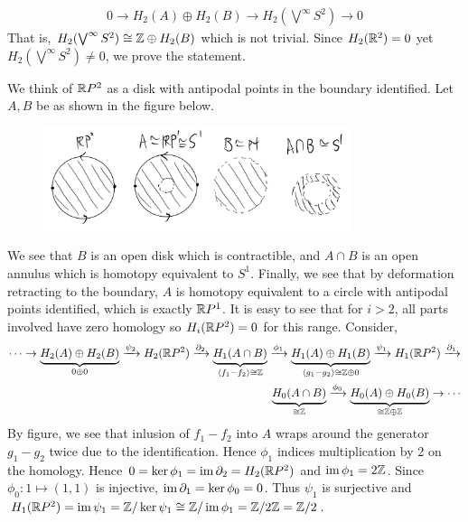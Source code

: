 \documentclass[12pt]{article}
\begin{document}
\begin{problem}[9]
\begin{align*}
	0 \to H_2(A) \oplus H_2(B) \to H_2(\bigvee^ \infty S^2) \to 0  
\end{align*}
That is, $H_2(\bigvee^ \infty S^2 ) \cong \mathbb{Z} \oplus H_2(B)$ which is not trivial. Since $ H_2(\mathbb{R}^2) = 0$ yet $ H_2(\bigvee^{ \infty}S^2) \neq 0$, we prove the statement.
\end{problem}

\begin{problem}[10]
We think of $ \mathbb{R} P^2$ as a disk with antipodal points in the boundary identified. Let $ A,B$ be as shown in the figure below.
~\begin{figure}[H]
	\centering
	\includegraphics[width=0.8\textwidth]{./figures/MV_RP2.png}
	\caption{}
\end{figure}
We see that $ B$ is an open disk which is contractible, and $ A \cap B$ is an open annulus which is homotopy equivalent to $ S^{1}$. Finally, we see that by deformation retracting to the boundary, $ A$ is homotopy equivalent to a circle with antipodal points identified, which is exactly $ \mathbb{R} P^{1}$. It is easy to see that for $i>2 $, all parts involved have zero homology so $ H_i( \mathbb{R} P^2) = 0$ for this range. Consider,
\begin{align*}
	\cdots \to \underbrace{ H_2(A) \oplus  H_2(B)}_{ 0 \oplus 0}  \xrightarrow{ \psi_2} H_2 (\mathbb{R} P^2) \xrightarrow{ \partial_2} \underbrace{ H_1(A \cap B)}_{ \langle f_1-f_2 \rangle \cong \mathbb{Z}} \xrightarrow{ \phi_1} \underbrace{ H_1(A) \oplus H_1(B)}_{\langle g_1- g_2 \rangle \cong\mathbb{Z} \oplus 0} \xrightarrow{ \psi_1} H_1(\mathbb{R} P^2) \xrightarrow{ \partial _1}\\
	\underbrace{ H_0(A \cap B)}_{ \cong \mathbb{Z} } \xrightarrow{ \phi_0} \underbrace{ H_0(A) \oplus H_0(B)}_{ \cong \mathbb{Z}\oplus \mathbb{Z} } \to \cdots    
\end{align*}
By figure, we see that inlusion of $ f_1-f_2$ into $ A$ wraps around the generator  $ g_1-g_2$ twice due to the identification. Hence $ \phi_1$ indices multiplication by 2 on the homology. Hence $ 0=\ker \phi_1 = \operatorname{im} \partial _2  = H_2(\mathbb{R} P^2)$ and $ \operatorname{im} \phi_1 = 2 \mathbb{Z}$. Since $ \phi_0: 1 \mapsto (1,1)$ is injective, $ \operatorname{im} \partial _1 = \ker \phi_0 =0$. Thus $ \psi_1 $ is surjective and $ H_1(\mathbb{R} P^2) = \operatorname{im} \psi_1 = \mathbb{Z} / \ker \psi_1 \cong \mathbb{Z} / \operatorname{im}  \phi_1 = \mathbb{Z} / 2 \mathbb{Z} =  \mathbb{Z} /2$.


\end{problem}
\end{document}
